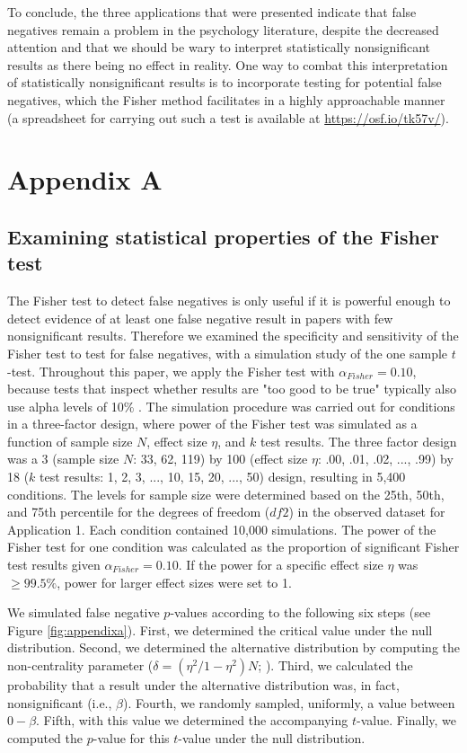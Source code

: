 \documentclass{article}
\begin{document}
To conclude, the three applications that were presented indicate that false negatives remain a problem in the psychology literature, despite the decreased attention and that we should be wary to interpret statistically nonsignificant results as there being no effect in reality. One way to combat this interpretation of statistically nonsignificant results is to incorporate testing for potential false negatives, which the Fisher method facilitates in a highly approachable manner  (a spreadsheet for carrying out such a test is available at \url{https://osf.io/tk57v/}).

\section*{Appendix A}
\label{apA}
\subsection*{Examining statistical properties of the Fisher test}
The Fisher test to detect false negatives is only useful if it is powerful enough to detect evidence of at least one false negative result in papers with few nonsignificant results. Therefore we examined the specificity and sensitivity of the Fisher test to test for false negatives, with a simulation study of the one sample $t$-test. Throughout this paper, we apply the Fisher test with $\alpha_{Fisher}=0.10$, because tests that inspect whether results are "too good to be true" typically also use alpha levels of 10\% \cite{Sterne2000-wh,Ioannidis2007-hh,Francis2012-kw}. The simulation procedure was carried out for conditions in a three-factor design, where power of the Fisher test was simulated as a function of sample size $N$, effect size $\eta$, and $k$ test results. The three factor design was a 3 (sample size $N$: 33, 62, 119) by 100 (effect size $\eta$: .00, .01, .02, ..., .99) by 18 ($k$ test results: 1, 2, 3, ..., 10, 15, 20, ..., 50) design, resulting in 5,400 conditions. The levels for sample size were determined based on the 25th, 50th, and 75th percentile for the degrees of freedom ($df2$) in the observed dataset for Application 1. Each condition contained 10,000 simulations. The power of the Fisher test for one condition was calculated as the proportion of significant Fisher test results given $\alpha_{Fisher}=0.10$. If the power for a specific effect size $\eta$ was $\geq99.5\%$, power for larger effect sizes were set to 1.

We simulated false negative $p$-values according to the following six steps (see Figure \ref{fig:appendixa}). First, we determined the critical value under the null distribution. Second, we determined the alternative distribution by computing the non-centrality parameter ($\delta=(\eta^2/1-\eta^2)N$; \cite{Steiger1997-qq,Smithson2001-aw}). Third, we calculated the probability that a result under the alternative distribution was, in fact, nonsignificant (i.e., $\beta$). Fourth, we randomly sampled, uniformly, a value between $0-\beta$. Fifth, with this value we determined the accompanying $t$-value. Finally, we computed the $p$-value for this $t$-value under the null distribution. 
\end{document}
